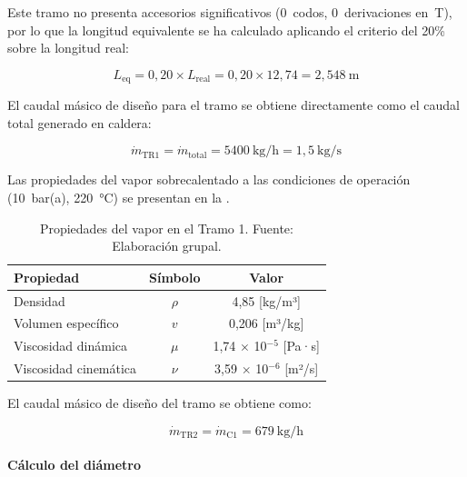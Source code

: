 \documentclass[12pt]{article}
\begin{document}
Este tramo no presenta accesorios significativos (0~codos, 0~derivaciones en~T), por lo que la longitud equivalente se ha calculado aplicando el criterio del 20\% sobre la longitud real:

\begin{equation}
	L_{\text{eq}} = 0{,}20 \times L_{\text{real}} = 0{,}20 \times 12{,}74 = 2{,}548 \ \text{m}
	\label{eq:Leq-tramo1}
\end{equation}

El caudal m\'asico de dise\~no para el tramo se obtiene directamente como el caudal total generado en caldera:

\begin{equation}
	\dot{m}_{\text{TR1}} = \dot{m}_{\text{total}} = 5400~\text{kg/h} = 1{,}5~\text{kg/s}
	\label{eq:caudal-tramo1}
\end{equation}

Las propiedades del vapor sobrecalentado a las condiciones de operación (10~bar(a), 220~°C) se presentan en la .

\begin{table}[H]
	\centering
	\caption{Propiedades del vapor en el Tramo 1. Fuente: Elaboración grupal.}
	\label{tab:propiedades-vapor-tramo1}
	\begin{tabular}{lcc}
		\toprule
		\textbf{Propiedad}    & \textbf{Símbolo} & \textbf{Valor}                 \\
		\midrule
		Densidad              & $\rho$           & 4,85 [kg/m³]                   \\
		Volumen específico    & $v$              & 0,206 [m³/kg]                  \\
		Viscosidad dinámica   & $\mu$            & 1,74 $\times$ 10$^{-5}$ [Pa·s] \\
		Viscosidad cinemática & $\nu$            & 3,59 $\times$ 10$^{-6}$ [m²/s] \\
		\bottomrule
	\end{tabular}
\end{table}

El caudal m\'asico de dise\~no del tramo se obtiene como:

\begin{equation}
	\dot{m}_{\text{TR2}} = \dot{m}_{\text{C1}} = 679~\text{kg/h}
	\label{eq:caudal-tramo2}
\end{equation}

\paragraph{Cálculo del diámetro}
\end{document}
